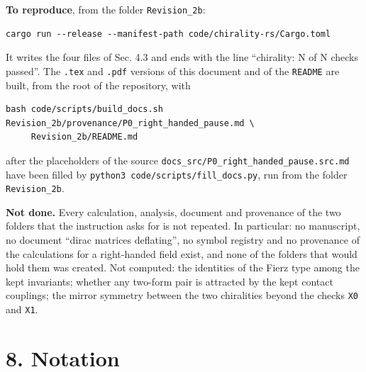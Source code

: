\documentclass[
  10pt,
]{article}
\begin{document}
\textbf{To reproduce}, from the folder \texttt{Revision\_2b}:

\begin{verbatim}
cargo run --release --manifest-path code/chirality-rs/Cargo.toml
\end{verbatim}

It writes the four files of Sec. 4.3 and ends with the line ``chirality:
N of N checks passed''. The \texttt{.tex} and \texttt{.pdf} versions of
this document and of the \texttt{README} are built, from the root of the
repository, with

\begin{verbatim}
bash code/scripts/build_docs.sh Revision_2b/provenance/P0_right_handed_pause.md \
     Revision_2b/README.md
\end{verbatim}

after the placeholders of the source
\texttt{docs\_src/P0\_right\_handed\_pause.src.md} have been filled by
\texttt{python3\ code/scripts/fill\_docs.py}, run from the folder
\texttt{Revision\_2b}.

\textbf{Not done.} Every calculation, analysis, document and provenance
of the two folders that the instruction asks for is not repeated. In
particular: no manuscript, no document ``dirac matrices deflating'', no
symbol registry and no provenance of the calculations for a right-handed
field exist, and none of the folders that would hold them was created.
Not computed: the identities of the Fierz type among the kept
invariants; whether any two-form pair is attracted by the kept contact
couplings; the mirror symmetry between the two chiralities beyond the
checks \texttt{X0} and \texttt{X1}.

\hypertarget{notation}{%
\section{8. Notation}\label{notation}}
\end{document}
